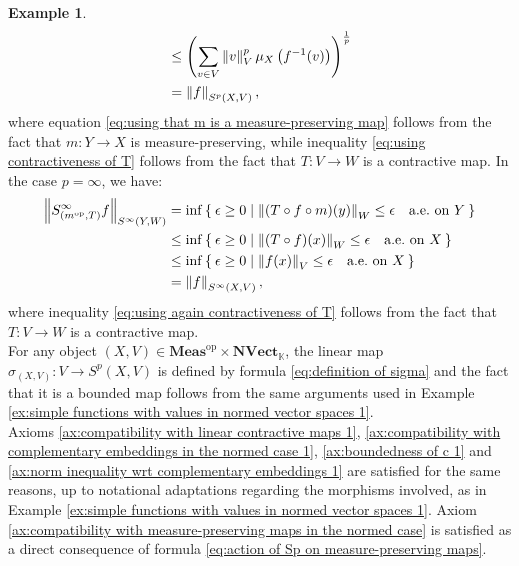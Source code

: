 \documentclass{amsart}
\theoremstyle{definition}
\newtheorem{example}[definition]{Example}
\theoremstyle{plain}
\newcommand{\norm}[1]{\left\lVert #1\right\rVert} %
\newcommand{\opMeas}{\mathbf{Meas}^\mathrm{op}}
\newcommand{\NVect}{\mathbf{NVect}_{\mathbb{K}}}
\begin{document}
\begin{example}
\begin{align}
                & \leq \left( \sum_{v \in V} \norm{v}_V^p \mu_X\left( f^{-1}(v) \right) \right)^{\frac{1}{p}} \label{eq:using contractiveness of T} \\
                &= \norm{f}_{S^p(X,V)}, \notag
            \end{align}
            where equation \eqref{eq:using that m is a measure-preserving map} follows from the fact that $m \colon Y \rightarrow X$ is measure-preserving, while inequality \eqref{eq:using contractiveness of T} follows from the fact that $T \colon V \rightarrow W$ is a contractive map.
            In the case $p = \infty$, we have:
            \begin{align}
                \norm{S^\infty_{\left( m^{\mathrm{op}},T \right)} f}_{S^\infty(Y,W)} &= \inf \Set{\epsilon \geq 0 | \norm{(T \circ f \circ m)(y)}_W \leq \epsilon \quad \text{a.e.~on} ~ Y} \notag \\
                &\leq \inf \Set{\epsilon \geq 0 | \norm{(T \circ f)(x)}_W \leq \epsilon \quad \text{a.e.~on} ~ X} \notag \\
                &\leq \inf \Set{\epsilon \geq 0 | \norm{f(x)}_V \leq \epsilon \quad \text{a.e.~on} ~ X} \label{eq:using again contractiveness of T} \\
                &= \norm{f}_{S^\infty(X,V)}, \notag
            \end{align}
            where inequality \eqref{eq:using again contractiveness of T} follows from the fact that $T \colon V \rightarrow W$ is a contractive map. \\
            For any object $(X,V) \in \opMeas \times \NVect$, the linear map $\sigma_{(X,V)} \colon V \rightarrow S^p(X,V)$ is defined by formula \eqref{eq:definition of sigma} and the fact that it is a bounded map follows from the same arguments used in Example \ref{ex:simple functions with values in normed vector spaces 1}. \\
            Axioms \ref{ax:compatibility with linear contractive maps 1}, \ref{ax:compatibility with complementary embeddings in the normed case 1}, \ref{ax:boundedness of c 1} and \ref{ax:norm inequality wrt complementary embeddings 1} are satisfied for the same reasons, up to notational adaptations regarding the morphisms involved, as in Example \ref{ex:simple functions with values in normed vector spaces 1}.
            Axiom \ref{ax:compatibility with measure-preserving maps in the normed case} is satisfied as a direct consequence of formula \eqref{eq:action of Sp on measure-preserving maps}. 
        \end{example}
\end{document}

